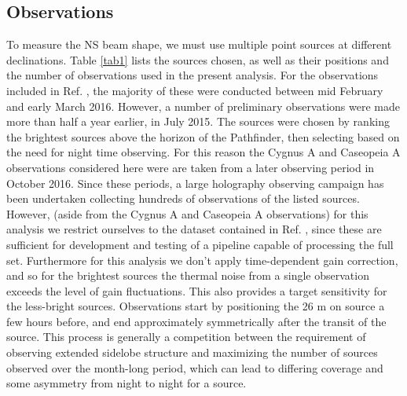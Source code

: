\subsection{Observations} \label{ch:hol:sec:io:ss:o}

To measure the NS beam shape, we must use multiple point sources at different declinations. Table \ref{tab1} lists the sources chosen, as well as their positions and the number of observations used in the present analysis. For the observations included in Ref. \citep{bergernewburgh}, the majority of these were conducted between mid February and early March 2016. However, a number of preliminary observations were made more than half a year earlier, in July 2015. The sources were chosen by ranking the brightest sources above the horizon of the Pathfinder, then selecting based on the need for night time observing. For this reason the Cygnus A and Caseopeia A observations considered here were are taken from a later observing period in October 2016. Since these periods, a large holography observing campaign has been undertaken collecting hundreds of observations of the listed sources. However, (aside from the Cygnus A and Caseopeia A observations) for this analysis we restrict ourselves to the dataset contained in Ref. \citep{bergernewburgh}, since these are sufficient for development and testing of a pipeline capable of processing the full set. Furthermore for this analysis we don't apply time-dependent gain correction, and so for the brightest sources the thermal noise from a single observation exceeds the level of gain fluctuations. This also provides a target sensitivity for the less-bright sources. Observations start by positioning the 26 m on source a few hours before, and end approximately symmetrically after the transit of the source. This process is generally a competition between the requirement of observing extended sidelobe structure and maximizing the number of sources observed over the month-long period, which can lead to differing coverage and some asymmetry from night to night for a source.

